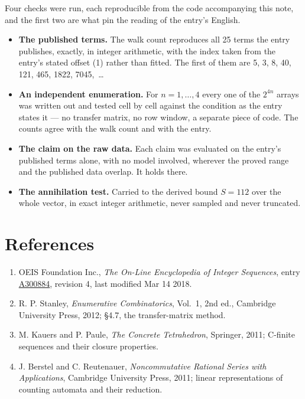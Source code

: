 \documentclass[11pt]{article}
\theoremstyle{definition}
\begin{document}
Four checks were run, each reproducible from the code accompanying this note, and the first two are what pin the reading of the entry's English.

\begin{itemize}

\item {\bfseries The published terms.} The walk count reproduces all 25 terms the entry publishes, exactly, in integer arithmetic, with the index taken from the entry's stated offset (1) rather than fitted. The first of them are 5, 3, 8, 40, 121, 465, 1822, 7045,~\dots

\item {\bfseries An independent enumeration.} For $n = 1,\dots,4$ every one of the $2^{4n}$ arrays was written out and tested cell by cell against the condition as the entry states it --- no transfer matrix, no row window, a separate piece of code. The counts agree with the walk count and with the entry.

\item {\bfseries The claim on the raw data.} Each claim was evaluated on the entry's published terms alone, with no model involved, wherever the proved range and the published data overlap. It holds there.

\item {\bfseries The annihilation test.} Carried to the derived bound $S = 112$ over the whole vector, in exact integer arithmetic, never sampled and never truncated.

\end{itemize}

\section{References}

\begin{enumerate}

\item OEIS Foundation Inc., \emph{The On-Line Encyclopedia of Integer Sequences}, entry \href{https://oeis.org/A300884}{A300884}, revision 4, last modified Mar 14 2018.

\item R. P. Stanley, \emph{Enumerative Combinatorics}, Vol.~1, 2nd ed., Cambridge University Press, 2012; \S4.7, the transfer-matrix method.

\item M. Kauers and P. Paule, \emph{The Concrete Tetrahedron}, Springer, 2011; C-finite sequences and their closure properties.

\item J. Berstel and C. Reutenauer, \emph{Noncommutative Rational Series with Applications}, Cambridge University Press, 2011; linear representations of counting automata and their reduction.

\end{enumerate}
\end{document}
